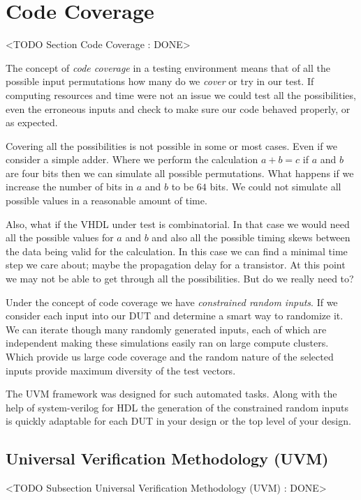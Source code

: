 \section{Code Coverage}
	<TODO Section Code Coverage : DONE>
	
The concept of \emph{code coverage} in a testing environment means that of all the possible input permutations how many do we \emph{cover} or try in our test. If computing resources and time were not an issue we could test all the possibilities, even the erroneous inputs and check to make sure our code behaved properly, or as expected. 

Covering all the possibilities is not possible in some or most cases. Even if we consider a simple adder. Where we perform the calculation $a+b=c$ if $a$ and $b$ are four bits then we can simulate all possible permutations. What happens if we increase the number of bits in $a$ and $b$ to be $64$ bits. We could not simulate all possible values in a reasonable amount of time.

Also, what if the \ac{VHDL} under test is combinatorial. In that case we would need all the possible values for $a$ and $b$ and also all the possible timing skews between the data being valid for the calculation. In this case we can find a minimal time step we care about; maybe the propagation delay for a transistor. At this point we may not be able to get through all the possibilities. But do we really need to?

Under the concept of code coverage we have \emph{constrained random inputs}. If we consider each input into our \ac{DUT} and determine a smart way to randomize it. We can iterate though many randomly generated inputs, each of which are independent making these simulations easily ran on large compute clusters. Which provide us large code coverage and the random nature of the selected inputs provide maximum diversity of the test vectors.  

The \ac{UVM} framework was designed for such automated tasks. Along with the help of system-verilog for \ac{HDL} the generation of the constrained random inputs is quickly adaptable for each \ac{DUT} in your design or the top level of your design.

\subsection{Universal Verification Methodology (UVM)}
	<TODO Subsection Universal Verification Methodology (UVM) : DONE>

